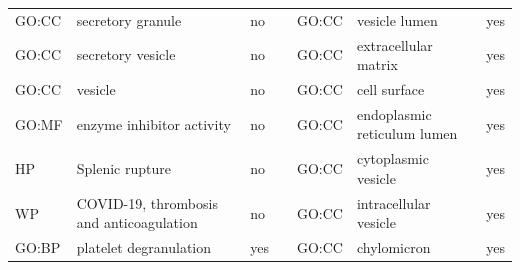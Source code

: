 \begin{longtable}{@{}lp{5cm}lllp{5cm}l@{}}
GO:CC           & secretory granule                                                                                                                  & no               &           & GO:CC           & vesicle lumen                                                                                                                                                          & yes              \\
GO:CC           & secretory vesicle                                                                                                                  & no               &           & GO:CC           & extracellular matrix                                                                                                                                                   & yes              \\
GO:CC           & vesicle                                                                                                                            & no               &           & GO:CC           & cell surface                                                                                                                                                           & yes              \\
GO:MF           & enzyme inhibitor activity                                                                                                          & no               &           & GO:CC           & endoplasmic reticulum lumen                                                                                                                                            & yes              \\
HP              & Splenic rupture                                                                                                                    & no               &           & GO:CC           & cytoplasmic vesicle                                                                                                                                                    & yes              \\
WP              & COVID-19, thrombosis and anticoagulation                                                                                           & no               &           & GO:CC           & intracellular vesicle                                                                                                                                                  & yes              \\
GO:BP           & platelet degranulation                                                                                                             & yes              &           & GO:CC           & chylomicron                                                                                                                                                            & yes              \\

\end{longtable}
